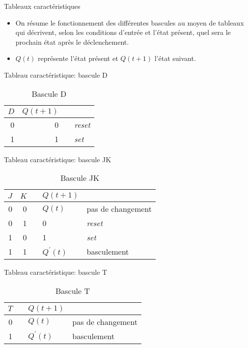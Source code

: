 \documentclass[presentation]{beamer}
\begin{document}
\begin{frame}[label={sec:org7358e95}]{Tableaux caractéristiques}
\begin{itemize}
\item On résume le fonctionnement des différentes bascules au moyen de tableaux qui décrivent, selon les conditions d'entrée et l'état présent, quel sera le prochain état après le déclenchement.

\item \(Q(t)\) représente l'état présent et \(Q(t+1)\) l'état suivant.
\end{itemize}
\end{frame}

\begin{frame}[label={sec:org04d9d4e}]{Tableau caractéristique: bascule D}
\begin{table}[htbp]
\caption{\label{tab:org57d1401}Bascule D}
\centering
\begin{tabular}{rrll}
\(D\) & \(Q(t+1)\) &  & \\
\hline
0 & 0 &  & \emph{reset}\\
1 & 1 &  & \emph{set}\\
\end{tabular}
\end{table}
\end{frame}

\begin{frame}[label={sec:org4815322}]{Tableau caractéristique: bascule JK}
\begin{table}[htbp]
\caption{\label{tab:org8246c96}Bascule JK}
\centering
\begin{tabular}{rrlll}
\(J\) & \(K\) &  & \(Q(t+1)\) & \\
\hline
0 & 0 &  & \(Q(t)\) & pas de changement\\
0 & 1 &  & 0 & \emph{reset}\\
1 & 0 &  & 1 & \emph{set}\\
1 & 1 &  & \(Q^\prime(t)\) & basculement\\
\end{tabular}
\end{table}
\end{frame}

\begin{frame}[label={sec:org4e39722}]{Tableau caractéristique: bascule T}
\begin{table}[htbp]
\caption{\label{tab:org6d0121b}Bascule T}
\centering
\begin{tabular}{rlll}
\(T\) &  & \(Q(t+1)\) & \\
\hline
0 &  & \(Q(t)\) & pas de changement\\
1 &  & \(Q^\prime(t)\) & basculement\\
\end{tabular}
\end{table}
\end{frame}
\end{document}
